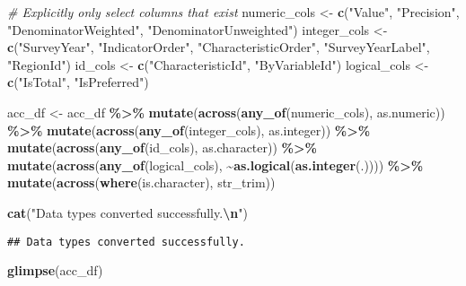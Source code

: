 \documentclass[
]{article}
\newenvironment{Shaded}{\begin{snugshade}}{\end{snugshade}}
\newcommand{\CommentTok}[1]{\textcolor[rgb]{0.56,0.35,0.01}{\textit{#1}}}
\newcommand{\FunctionTok}[1]{\textcolor[rgb]{0.13,0.29,0.53}{\textbf{#1}}}
\newcommand{\NormalTok}[1]{#1}
\newcommand{\OtherTok}[1]{\textcolor[rgb]{0.56,0.35,0.01}{#1}}
\newcommand{\SpecialCharTok}[1]{\textcolor[rgb]{0.81,0.36,0.00}{\textbf{#1}}}
\newcommand{\StringTok}[1]{\textcolor[rgb]{0.31,0.60,0.02}{#1}}
\begin{document}
\begin{Shaded}
\begin{Highlighting}[]
\CommentTok{\# Explicitly only select columns that exist}
\NormalTok{numeric\_cols }\OtherTok{\textless{}{-}} \FunctionTok{c}\NormalTok{(}\StringTok{"Value"}\NormalTok{, }\StringTok{"Precision"}\NormalTok{, }\StringTok{"DenominatorWeighted"}\NormalTok{, }\StringTok{"DenominatorUnweighted"}\NormalTok{)}
\NormalTok{integer\_cols }\OtherTok{\textless{}{-}} \FunctionTok{c}\NormalTok{(}\StringTok{"SurveyYear"}\NormalTok{, }\StringTok{"IndicatorOrder"}\NormalTok{, }\StringTok{"CharacteristicOrder"}\NormalTok{, }\StringTok{"SurveyYearLabel"}\NormalTok{, }\StringTok{"RegionId"}\NormalTok{)}
\NormalTok{id\_cols }\OtherTok{\textless{}{-}} \FunctionTok{c}\NormalTok{(}\StringTok{"CharacteristicId"}\NormalTok{, }\StringTok{"ByVariableId"}\NormalTok{)}
\NormalTok{logical\_cols }\OtherTok{\textless{}{-}} \FunctionTok{c}\NormalTok{(}\StringTok{"IsTotal"}\NormalTok{, }\StringTok{"IsPreferred"}\NormalTok{)}

\NormalTok{acc\_df }\OtherTok{\textless{}{-}}\NormalTok{ acc\_df }\SpecialCharTok{\%\textgreater{}\%}
  \FunctionTok{mutate}\NormalTok{(}\FunctionTok{across}\NormalTok{(}\FunctionTok{any\_of}\NormalTok{(numeric\_cols), as.numeric)) }\SpecialCharTok{\%\textgreater{}\%}
  \FunctionTok{mutate}\NormalTok{(}\FunctionTok{across}\NormalTok{(}\FunctionTok{any\_of}\NormalTok{(integer\_cols), as.integer)) }\SpecialCharTok{\%\textgreater{}\%}
  \FunctionTok{mutate}\NormalTok{(}\FunctionTok{across}\NormalTok{(}\FunctionTok{any\_of}\NormalTok{(id\_cols), as.character)) }\SpecialCharTok{\%\textgreater{}\%}
  \FunctionTok{mutate}\NormalTok{(}\FunctionTok{across}\NormalTok{(}\FunctionTok{any\_of}\NormalTok{(logical\_cols), }\SpecialCharTok{\textasciitilde{}}\FunctionTok{as.logical}\NormalTok{(}\FunctionTok{as.integer}\NormalTok{(.)))) }\SpecialCharTok{\%\textgreater{}\%}
  \FunctionTok{mutate}\NormalTok{(}\FunctionTok{across}\NormalTok{(}\FunctionTok{where}\NormalTok{(is.character), str\_trim))}

\FunctionTok{cat}\NormalTok{(}\StringTok{"Data types converted successfully.}\SpecialCharTok{\textbackslash{}n}\StringTok{"}\NormalTok{)}
\end{Highlighting}
\end{Shaded}

\begin{verbatim}
## Data types converted successfully.
\end{verbatim}

\begin{Shaded}
\begin{Highlighting}[]
\FunctionTok{glimpse}\NormalTok{(acc\_df)}
\end{Highlighting}
\end{Shaded}
\end{document}
